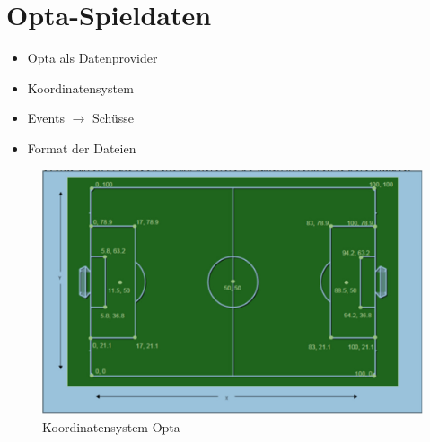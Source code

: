 \section{Opta-Spieldaten}

\begin{itemize}
\item Opta als Datenprovider
\item Koordinatensystem
\item Events $\rightarrow$ Schüsse
\item Format der Dateien 
\end{itemize}

\begin{figure}[H]
\centering
\includegraphics[scale=0.4]{se-wa-jpg/opta_pitch}
\caption[Koordinatensystem Opta]{Koordinatensystem Opta\protect\footnotemark}
\label{opta_pitch}
\end{figure}

